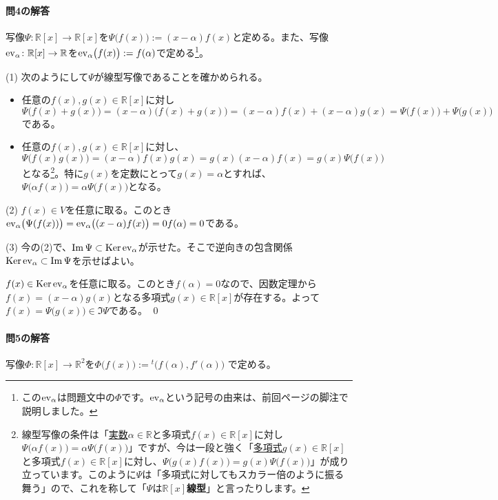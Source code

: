 \paragraph{問4の解答}

写像$\Psi\colon \mathbb{R}[x]\rightarrow\mathbb{R}[x]$を$\Psi\bigl(f(x)\bigr) := (x - \alpha) f(x)$と定める。また、写像$\operatorname{ev}_{\alpha}\colon \mathbb{R}[x]\rightarrow\mathbb{R}$を$\operatorname{ev}_{\alpha}\bigl(f(x)\bigr) := f(\alpha)$で定める\footnote{この$\operatorname{ev}_{\alpha}$は問題文中の$\Phi$です。$\operatorname{ev}_{\alpha}$という記号の由来は、前回\pageref{footnote:evaluation_map}ページの脚注で説明しました。}。

\noindent (1) 次のようにして$\Psi$が線型写像であることを確かめられる。
\begin{itemize}
\item 任意の$f(x), g(x)\in\mathbb{R}[x]$に対し$\Psi\bigl(f(x) + g(x)\bigr) = (x - \alpha)\bigl(f(x) + g(x)\bigr) = (x - \alpha)f(x) + (x - \alpha)g(x) = \Psi\bigl(f(x)\bigr) + \Psi\bigl(g(x)\bigr)$である。
\item 任意の$f(x), g(x)\in\mathbb{R}[x]$に対し、$\Psi\bigl(f(x) g(x)\bigr) = (x - \alpha)f(x)g(x) = g(x)(x - \alpha)f(x) = g(x)\Psi\bigl(f(x)\bigr)$となる\footnote{線型写像の条件は「\uline{実数}$\alpha\in\mathbb{R}$と多項式$f(x)\in\mathbb{R}[x]$に対し$\Psi\bigl(\alpha f(x)\bigr) = \alpha\Psi\bigl(f(x)\bigr)$」ですが、今は一段と強く「\uline{多項式}$g(x)\in\mathbb{R}[x]$と多項式$f(x)\in\mathbb{R}[x]$に対し、$\Psi\bigl(g(x)f(x)\bigr) = g(x)\Psi\bigl(f(x)\bigr)$」が成り立っています。このように$\Psi$は「多項式に対してもスカラー倍のように振る舞う」ので、これを称して「$\Psi$は\textbf{$\mathbb{R}[x]$線型}」と言ったりします。}。特に$g(x)$を定数にとって$g(x) = \alpha$とすれば、$\Psi\bigl(\alpha f(x)\bigr) = \alpha \Psi\bigl(f(x)\bigr)$となる。
\end{itemize}

\noindent (2) $f(x) \in V$を任意に取る。このとき$\operatorname{ev}_{\alpha}\bigl(\Psi(f(x))\bigr) = \operatorname{ev}_{\alpha}\bigl((x - \alpha)f(x)\bigr) = 0 f(\alpha) = 0$である。

\noindent (3) 今の(2)で、$\mathrm{Im}\,\Psi\subset\operatorname{Ker}\operatorname{ev}_{\alpha}$が示せた。そこで逆向きの包含関係$\operatorname{Ker}\operatorname{ev}_{\alpha} \subset \mathrm{Im}\, \Psi$を示せばよい。

$f(x) \in \operatorname{Ker} \operatorname{ev}_{\alpha}$を任意に取る。このとき$f(\alpha) = 0$なので、因数定理から$f(x) = (x - \alpha)g(x)$となる多項式$g(x) \in \mathbb{R}[x]$が存在する。よって$f(x) = \Psi\bigl(g(x)\bigr) \in \Im \Psi$である。 \qed
 
\paragraph{問5の解答} 写像$\Phi\colon \mathbb{R}[x] \rightarrow \mathbb{R}^2$を$\Phi\bigl(f(x)\bigr) :=  {}^t\bigl( f(\alpha), f'(\alpha) \bigr)$
で定める。	

